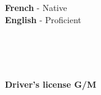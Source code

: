 \documentclass[8pt]{cv} %
\begin{document}

\begin{minipage}[t]{0.3\textwidth}
	\vspace{-\baselineskip} %

	
	\textbf{French} - Native\\
	\textbf{English} - Proficient\\
\end{minipage}
\hfill
\begin{minipage}[t]{0.3\textwidth}
	\vspace{-\baselineskip} %
	
	
	\\
	\\
	\\
\end{minipage}
\hfill
\begin{minipage}[t]{0.3\textwidth}
	\vspace{-\baselineskip} %
	
	
	\textbf{Driver's license G/M}\\
	
\end{minipage}

\end{document}
